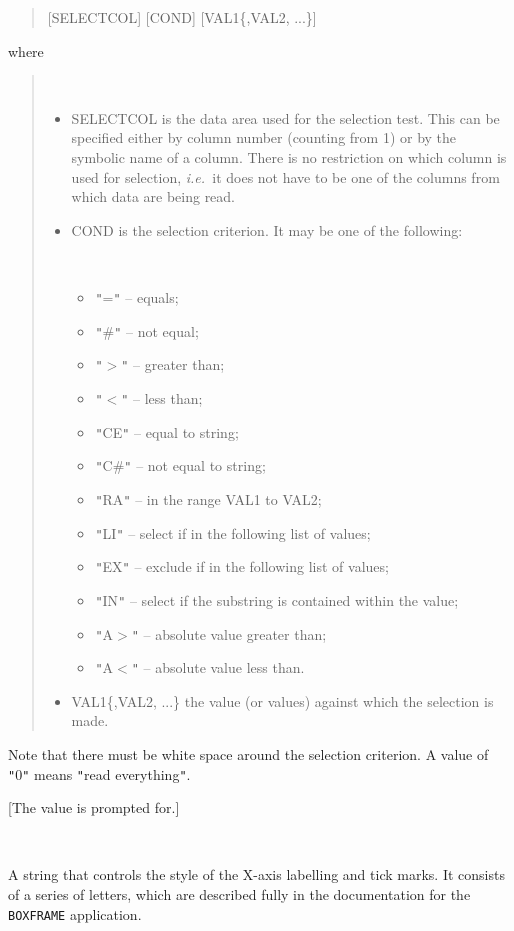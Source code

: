 \documentclass[twoside,11pt]{article}
\newcommand{\htmlref}[2]{#1}
\renewcommand{\_}{\texttt{\symbol{95}}}
\newcommand{\ie}{{\em i.e.\ }}
\newcommand{\cnam}[1]{{\tt #1}}
\newcommand{\iref} [1]{\htmlref{#1}{#1}}
\newcommand{\sstsubsection}[1]{ \item[{#1}] \mbox{} \\}
\newcommand{\sstitemlist}[1]{
  \mbox{} \\
  \vspace{-3.5ex}
  \begin{itemize}
     #1
  \end{itemize}
}
\newcommand{\sstitem}{\item}
\newcommand{\sstsubsection}[1]{\item[{#1}]}
\newcommand{\sstitemlist}[1]{
      \begin{itemize}
         #1
      \end{itemize}
      \\
   }
\newcommand{\sstitem}{\item}
\begin{document}
{{{         \begin{quote}
            [SELECT\_COL] [COND] [VAL1\{,VAL2, ...\}]
         \end{quote}

         where

         \begin{quote}
         \sstitemlist{

            \sstitem
               SELECT\_COL is the data area used for the selection
               test. This can be specified either by column number
               (counting from 1) or by the symbolic name of a column.
               There is no restriction on which column is used for
               selection, \ie it does not have to be one of the columns
               from which data are being read.

            \sstitem
               COND is the selection criterion. It may be one of the
               following:

            \sstitemlist{

               \sstitem {\tt "}={\tt "} -- equals;
               \sstitem {\tt "}\#{\tt "} -- not equal;
               \sstitem {\tt "}$>${\tt "} -- greater than;
               \sstitem {\tt "}$<${\tt "} -- less than;
               \sstitem {\tt "}CE{\tt "} -- equal to string;
               \sstitem {\tt "}C\#{\tt "} -- not equal to string;
               \sstitem {\tt "}RA{\tt "} -- in the range VAL1 to VAL2;
               \sstitem {\tt "}LI{\tt "} -- select if in the following list of values;
               \sstitem {\tt "}EX{\tt "} -- exclude if in the following list of values;
               \sstitem {\tt "}IN{\tt "} -- select if the substring is contained within the
               value;
               \sstitem {\tt "}A$>${\tt "} -- absolute value greater than;
               \sstitem {\tt "}A$<${\tt "} -- absolute value less than.
            }

            \sstitem
               VAL1\{,VAL2, ...\} the value (or values) against which the
               selection is made.

         }
         \end{quote}

         Note that there must be white space around the selection
         criterion. A value of {\tt "}0{\tt "} means {\tt "}read everything{\tt "}.

         [The value is prompted for.]
      }
      \sstsubsection{
         XOPT = \_CHAR (Read and Write)
      }{
         A string that controls the style of the X-axis labelling and
         tick marks. It consists of a series of letters, which are
         described fully in the documentation for the \cnam{\iref{BOXFRAME}}
         application.

}}}
\end{document}
